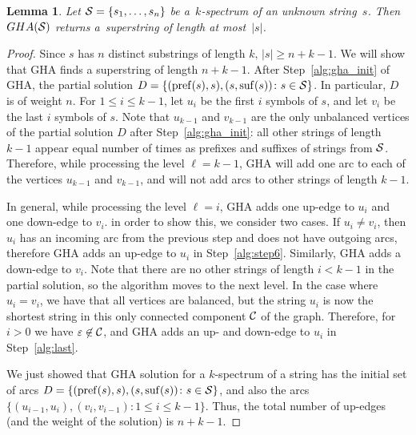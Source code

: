 \documentclass[11pt]{article}
\newtheorem{lemma}{Lemma}
\renewcommand{\geq}{\geqslant}
\renewcommand{\leq}{\leqslant}
\begin{document}
\begin{lemma}
Let ${\cal S}=\{s_1,\ldots,s_n\}$ be a~$k$-spectrum of an unknown string~$s$. Then $GHA({\cal S})$ returns a~superstring of length at most~$|s|$.
\end{lemma}

\begin{proof}
Since $s$ has $n$ distinct substrings of length $k, \, |s|\geq n+k-1$. We will show that GHA finds a superstring of length $n+k-1$. After Step~\ref{alg:gha_init} of GHA, the partial solution $D = \{(\operatorname{pref}(s), s), (s, \operatorname{suf}(s)) \colon s \in {\cal S}\}$. In particular, $D$ is of weight $n$. For $1\leq i\leq k-1$, let $u_{i}$ be the first $i$ symbols of $s$, and let $v_{i}$ be the last $i$ symbols of $s$. Note that $u_{k-1}$ and $v_{k-1}$ are the only unbalanced vertices of the partial solution $D$ after Step~\ref{alg:gha_init}: all other strings of length $k-1$ appear equal number of times as prefixes and suffixes of strings from ${\cal S}$. Therefore, while processing the level $\ell=k-1$, GHA will add one arc to each of the vertices $u_{k-1}$ and $v_{k-1}$, and will not add arcs to other strings of length $k-1$. 

In general, while processing the level $\ell=i$, GHA adds one up-edge to $u_i$ and one down-edge to $v_i$. in order to show this, we consider two cases. If $u_i \neq v_i$, then $u_i$ has an incoming arc from the previous step and does not have outgoing arcs, therefore GHA adds an up-edge to $u_i$ in Step~\ref{alg:step6}. Similarly, GHA adds a down-edge to $v_i$. Note that there are no other strings of length $i<k-1$ in the partial solution, so the algorithm moves to the next level. In the case where $u_i=v_i$, we have that all vertices are balanced, but the string $u_i$ is now the shortest string in this only connected component ${\cal C}$ of the graph. Therefore, for $i>0$ we have $\varepsilon\not\in{\cal C}$, and GHA adds an up- and down-edge to $u_i$ in Step~\ref{alg:last}. 

We just showed that GHA solution for a $k$-spectrum of a string has the initial set of arcs  $D = \{(\operatorname{pref}(s), s), (s, \operatorname{suf}(s)) \colon s \in {\cal S}\}$, and also the arcs $\{ (u_{i-1}, u_{i}), (v_i, v_{i-1})\colon 1\leq i\leq k-1 \}$. Thus, the total number of up-edges (and the weight of the solution) is $n+k-1$.
\end{proof}
\end{document}
